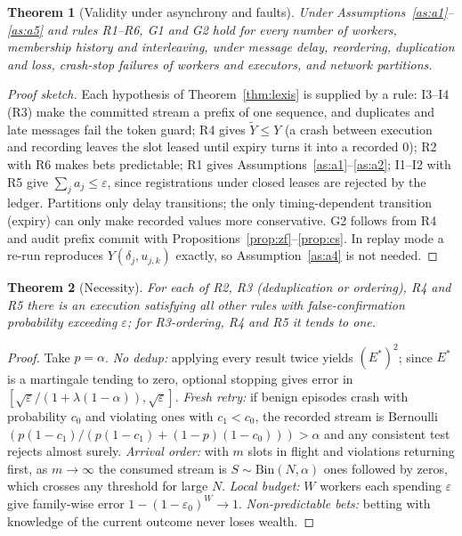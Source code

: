 \documentclass[11pt]{article}
\newtheorem{theorem}{Theorem}
\theoremstyle{definition}
\theoremstyle{remark}
\begin{document}
\begin{theorem}[Validity under asynchrony and faults]\label{thm:fresco}
Under Assumptions~\ref{as:a1}--\ref{as:a5} and rules R1--R6, G1 and G2 hold for every number of workers, membership history and interleaving, under message delay, reordering, duplication and loss, crash-stop failures of workers and executors, and network partitions.
\end{theorem}
\begin{proof}[Proof sketch]
Each hypothesis of Theorem~\ref{thm:lexis} is supplied by a rule: I3--I4 (R3) make the committed stream a prefix of one sequence, and duplicates and late messages fail the token guard; R4 gives $\tilde Y\le Y$ (a crash between execution and recording leaves the slot leased until expiry turns it into a recorded 0); R2 with R6 makes bets predictable; R1 gives Assumptions~\ref{as:a1}--\ref{as:a2}; I1--I2 with R5 give $\sum_ja_j\le\varepsilon$, since registrations under closed leases are rejected by the ledger. Partitions only delay transitions; the only timing-dependent transition (expiry) can only make recorded values more conservative. G2 follows from R4 and audit prefix commit with Propositions~\ref{prop:zf}--\ref{prop:cs}. In replay mode a re-run reproduces $Y(\delta_j,u_{j,k})$ exactly, so Assumption~\ref{as:a4} is not needed.
\end{proof}

\begin{theorem}[Necessity]\label{thm:necessity}
For each of R2, R3 (deduplication or ordering), R4 and R5 there is an execution satisfying all other rules with false-confirmation probability exceeding $\varepsilon$; for R3-ordering, R4 and R5 it tends to one.
\end{theorem}
\begin{proof}
Take $p=\alpha$. \emph{No dedup:} applying every result twice yields $(E^*)^2$; since $E^*$ is a martingale tending to zero, optional stopping gives error in $[\sqrt\varepsilon/(1+\lambda(1-\alpha)),\sqrt\varepsilon]$. \emph{Fresh retry:} if benign episodes crash with probability $c_0$ and violating ones with $c_1<c_0$, the recorded stream is Bernoulli$(p(1-c_1)/(p(1-c_1)+(1-p)(1-c_0)))>\alpha$ and any consistent test rejects almost surely. \emph{Arrival order:} with $m$ slots in flight and violations returning first, as $m\to\infty$ the consumed stream is $S\sim\mathrm{Bin}(N,\alpha)$ ones followed by zeros, which crosses any threshold for large $N$. \emph{Local budget:} $W$ workers each spending $\varepsilon$ give family-wise error $1-(1-\varepsilon_0)^W\to1$. \emph{Non-predictable bets:} betting with knowledge of the current outcome never loses wealth.
\end{proof}
\end{document}

